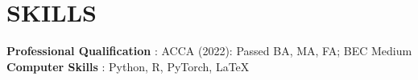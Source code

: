 \documentclass[letterpaper,11pt]{article}
\begin{document}
\section{SKILLS}
 \begin{itemize}[leftmargin=0in, label={}]
    \small{\item{
     \textbf{Professional Qualification} : ACCA (2022): Passed BA, MA, FA; BEC Medium \vspace{2pt} \\
     \textbf{Computer Skills} : Python, R, PyTorch, LaTeX
    }}
 \end{itemize}
\end{document}
